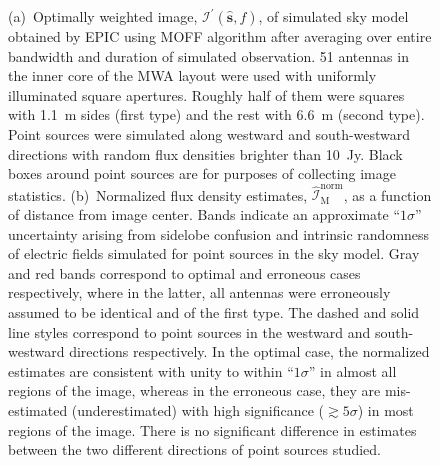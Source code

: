 \documentclass[a4paper,fleqn,usenatbib]{mnras}
\begin{document}
\begin{figure}
\caption{(a)~Optimally weighted image, $\mathcal{I}^\prime(\hat{\mathbf{s}},f)$, of simulated sky model obtained by EPIC using MOFF algorithm after averaging over entire bandwidth and duration of simulated observation. 51 antennas in the inner core of the MWA layout were used with uniformly illuminated square apertures. Roughly half of them were squares with 1.1~m sides (first type) and the rest with 6.6~m (second type). Point sources were simulated along westward and south-westward directions with random flux densities brighter than 10~Jy. Black boxes around point sources are for purposes of collecting image statistics. (b)~Normalized flux density estimates, $\widehat{\mathcal{I}}_\textrm{M}^\textrm{norm}$, as a function of distance from image center. Bands indicate an approximate ``$1\sigma$'' uncertainty arising from sidelobe confusion and intrinsic randomness of electric fields simulated for point sources in the sky model. Gray and red bands correspond to optimal and erroneous cases respectively, where in the latter, all antennas were erroneously assumed to be identical and of the first type. The dashed and solid line styles correspond to point sources in the westward and south-westward directions respectively. In the optimal case, the normalized estimates are consistent with unity to within ``$1\sigma$'' in almost all regions of the image, whereas in the erroneous case, they are mis-estimated (underestimated) with high significance ($\gtrsim 5\sigma$) in most regions of the image. There is no significant difference in estimates between the two different directions of point sources studied.}
\label{fig:versatility}
\end{figure}
\end{document}
